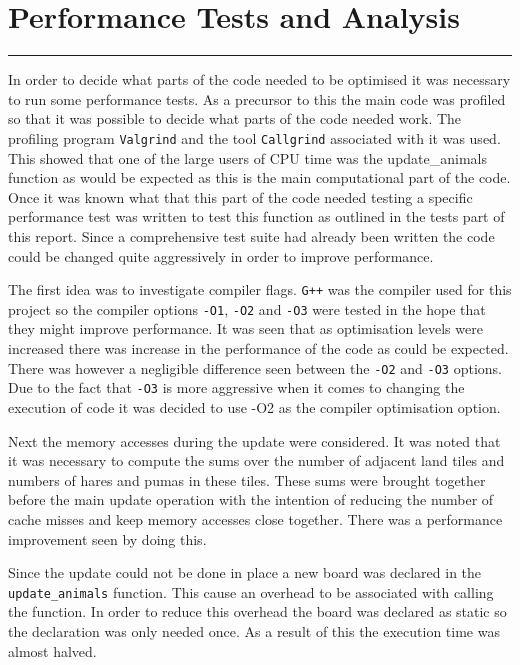 \section{Performance Tests and Analysis}
\vspace{-2em}\rule{\textwidth}{1pt}\vspace{1em}

In order to decide what parts of the code needed to be optimised it was necessary to run some performance tests.
As a precursor to this the main code was profiled so that it was possible to decide what parts of the code needed work.
The profiling program \texttt{Valgrind} and the tool \texttt{Callgrind} associated with it was used.
This showed that one of the large users of CPU time was the update\_animals function as would be expected as this is the main computational part of the code.
Once it was known what that this part of the code needed testing a specific performance test was written to test this function as outlined in the tests part of this report.
Since a comprehensive test suite had already been written the code could be changed quite aggressively in order to improve performance.

The first idea was to investigate compiler flags.
\texttt{G++} was the compiler used for this project so the compiler options \texttt{-O1}, \texttt{-O2} and \texttt{-O3} were tested in the hope that they might improve performance.
It was seen that as optimisation levels were increased there was increase in the performance of the code as could be expected.
There was however a negligible difference seen between the \texttt{-O2} and \texttt{-O3} options.
Due to the fact that \texttt{-O3} is more aggressive when it comes to changing the execution of code it was decided to use -O2 as the compiler optimisation option.

Next the memory accesses during the update were considered.
It was noted that it was necessary to compute the sums over the number of adjacent land tiles and numbers of hares and pumas in these tiles.
These sums were brought together before the main update operation with the intention of reducing the number of cache misses and keep memory accesses close together.
There was a performance improvement seen by doing this.

Since the update could not be done in place a new board was declared in the \texttt{update\_animals} function.
This cause an overhead to be associated with calling the function.
In order to reduce this overhead the board was declared as static so the declaration was only needed once.
As a result of this the execution time was almost halved.

